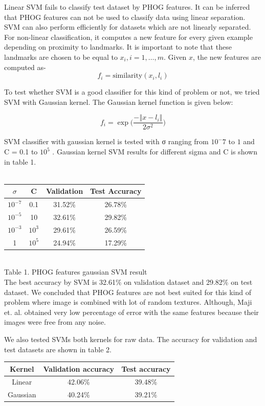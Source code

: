 \documentclass[10pt,twocolumn]{article}
\begin{document}
Linear SVM fails to classify test dataset by PHOG features. It can be inferred that PHOG features can not be used to classify data using linear separation.
SVM can also perform efficiently for datasets which are not linearly separated. For non-linear classification, it computes a new feature for every given example depending on proximity to landmarks. It is important to note that these landmarks are chosen to be equal to $x_i, i=1,…,m$. Given $x$, the new features are computed as-
\[f_i=\text{similarity}(x_i,l_i)\]
 
To test whether SVM is a good classifier for this kind of problem or not, we tried SVM with Gaussian kernel. The Gaussian kernel function is given below:

\[f_i=\exp\Big(\frac{-‖x-l_i ‖}{2\sigma^2 }\Big)\]

SVM classifier with gaussian kernel is tested with σ ranging from $10^-7$ to $1$ and C = 0.1 to $10^5$ \cite {larochelle2007empirical}. Gaussian kernel SVM results for different sigma and C is shown in table 1.
\\
\\
\begin{tabular}{|c|c|c|c|}
\hline
$\sigma$ & C &	Validation & Test Accuracy \\
\hline
$10^{-7}$  & 0.1	& 31.52\%	& 26.78\% \\
$10^{-5}$	 & 10	& 32.61\%	& 29.82\% \\
$10^{-3}$	 & $10^3$ & 29.61\%	& 26.59\% \\
1        &$10^5$ & 	24.94\% & 	17.29\% \\
\hline
\end{tabular}
\\

Table 1. PHOG features gaussian SVM result
\\

The best accuracy by SVM is 32.61\% on validation dataset and 29.82\% on test dataset. We concluded that PHOG features are not best suited for this kind of problem where image is combined with lot of random textures. Although, Maji et. al. obtained very low percentage of error with the same features because their images were free from any noise.

We also tested SVMs both kernels for raw data. The accuracy for validation and test datasets are shown in table 2.
\\

\begin{tabular}{|c|c|c|}
\hline
Kernel & Validation accuracy & Test accuracy \\ \hline
Linear & 42.06\% & 39.48\% \\
Gaussian & 40.24\% & 39.21\% \\
\hline
\end{tabular}
\\
\end{document}
